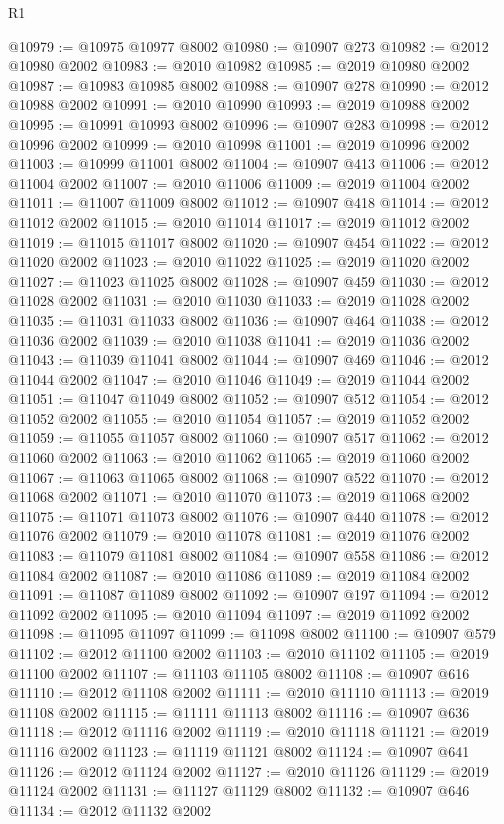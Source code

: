 \begin{lexlean}{R1}
\begin{coremodule}
@10979 := @10975 @10977 @8002
@10980 := @10907 @273
@10982 := @2012 @10980 @2002
@10983 := @2010 @10982
@10985 := @2019 @10980 @2002
@10987 := @10983 @10985 @8002
@10988 := @10907 @278
@10990 := @2012 @10988 @2002
@10991 := @2010 @10990
@10993 := @2019 @10988 @2002
@10995 := @10991 @10993 @8002
@10996 := @10907 @283
@10998 := @2012 @10996 @2002
@10999 := @2010 @10998
@11001 := @2019 @10996 @2002
@11003 := @10999 @11001 @8002
@11004 := @10907 @413
@11006 := @2012 @11004 @2002
@11007 := @2010 @11006
@11009 := @2019 @11004 @2002
@11011 := @11007 @11009 @8002
@11012 := @10907 @418
@11014 := @2012 @11012 @2002
@11015 := @2010 @11014
@11017 := @2019 @11012 @2002
@11019 := @11015 @11017 @8002
@11020 := @10907 @454
@11022 := @2012 @11020 @2002
@11023 := @2010 @11022
@11025 := @2019 @11020 @2002
@11027 := @11023 @11025 @8002
@11028 := @10907 @459
@11030 := @2012 @11028 @2002
@11031 := @2010 @11030
@11033 := @2019 @11028 @2002
@11035 := @11031 @11033 @8002
@11036 := @10907 @464
@11038 := @2012 @11036 @2002
@11039 := @2010 @11038
@11041 := @2019 @11036 @2002
@11043 := @11039 @11041 @8002
@11044 := @10907 @469
@11046 := @2012 @11044 @2002
@11047 := @2010 @11046
@11049 := @2019 @11044 @2002
@11051 := @11047 @11049 @8002
@11052 := @10907 @512
@11054 := @2012 @11052 @2002
@11055 := @2010 @11054
@11057 := @2019 @11052 @2002
@11059 := @11055 @11057 @8002
@11060 := @10907 @517
@11062 := @2012 @11060 @2002
@11063 := @2010 @11062
@11065 := @2019 @11060 @2002
@11067 := @11063 @11065 @8002
@11068 := @10907 @522
@11070 := @2012 @11068 @2002
@11071 := @2010 @11070
@11073 := @2019 @11068 @2002
@11075 := @11071 @11073 @8002
@11076 := @10907 @440
@11078 := @2012 @11076 @2002
@11079 := @2010 @11078
@11081 := @2019 @11076 @2002
@11083 := @11079 @11081 @8002
@11084 := @10907 @558
@11086 := @2012 @11084 @2002
@11087 := @2010 @11086
@11089 := @2019 @11084 @2002
@11091 := @11087 @11089 @8002
@11092 := @10907 @197
@11094 := @2012 @11092 @2002
@11095 := @2010 @11094
@11097 := @2019 @11092 @2002
@11098 := @11095 @11097
@11099 := @11098 @8002
@11100 := @10907 @579
@11102 := @2012 @11100 @2002
@11103 := @2010 @11102
@11105 := @2019 @11100 @2002
@11107 := @11103 @11105 @8002
@11108 := @10907 @616
@11110 := @2012 @11108 @2002
@11111 := @2010 @11110
@11113 := @2019 @11108 @2002
@11115 := @11111 @11113 @8002
@11116 := @10907 @636
@11118 := @2012 @11116 @2002
@11119 := @2010 @11118
@11121 := @2019 @11116 @2002
@11123 := @11119 @11121 @8002
@11124 := @10907 @641
@11126 := @2012 @11124 @2002
@11127 := @2010 @11126
@11129 := @2019 @11124 @2002
@11131 := @11127 @11129 @8002
@11132 := @10907 @646
@11134 := @2012 @11132 @2002

\end{coremodule}
\end{lexlean}
